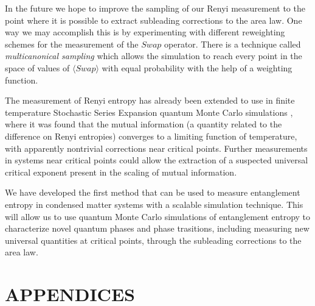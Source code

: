 \documentclass[letterpaper,12pt,titlepage,oneside,final]{report}
\renewcommand\bibname{References}
\begin{document}
In the future we hope to improve the sampling of our Renyi measurement to the point where it is possible to extract subleading corrections to the area law.  
One way we may accomplish this is by experimenting with different reweighting schemes for the measurement of the $Swap$ operator. 
There is a technique called {\it multicanonical sampling} \cite{canon1,canon2} which allows the simulation to reach every point in the space of values of $\langle Swap \rangle$ with equal probability with the help of a weighting function.

The measurement of Renyi entropy has already been extended to use in finite temperature Stochastic Series Expansion quantum Monte Carlo simulations \cite{kappa}, where it was found that the mutual information (a quantity related to the difference on Renyi entropies) converges to a limiting function of temperature, with apparently nontrivial corrections near critical points.
Further measurements in systems near critical points could allow the extraction of a suspected universal critical exponent present in the scaling of mutual information.

We have developed the first method that can be used to measure entanglement entropy in condensed matter systems with a scalable simulation technique.
This will allow us to use quantum Monte Carlo simulations of entanglement entropy to characterize novel quantum phases and phase trasitions, including measuring new universal quantities at critical points, through the subleading corrections to the area law.

\appendix
\chapter*{APPENDICES}








\renewcommand{\bibname}{References}

\nocite{*}
\end{document}
